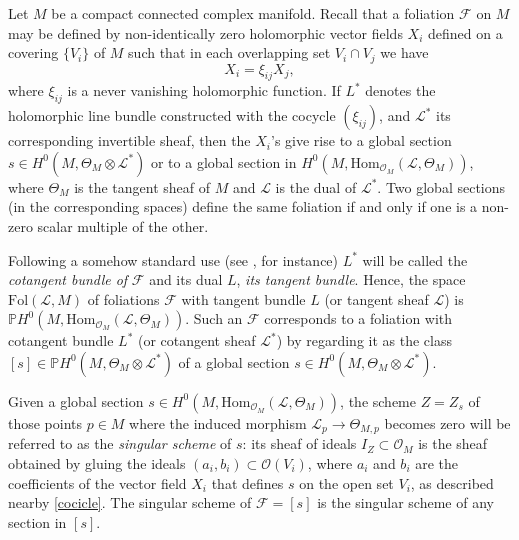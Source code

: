 \documentclass{amsart} %
\theoremstyle{definition}
\newcommand{\ctM}{\Theta_{M}}
\newcommand{\cts}{\Theta_{S_{\delta}}}
\newcommand{\PP}{\mathbb{P}}
\newcommand{\mcL}{\mathcal{L}}
\newcommand{\mcO}{\mathcal{O}}
\newcommand{\mcF}{\mathcal{F}}
\begin{document}
Let $ M $ be a compact connected complex manifold. Recall that a
foliation $\mathcal F$ on $ M $ %
may be defined by
non-identically zero holomorphic vector fields $ X_i $ defined on a covering $ \{ V_i \} $ of $ M $
such that in each overlapping set $ V_i \cap V_j $ we have
\begin{equation}\label{cocicle}
   X_i = \xi_{ij} X_j,
\end{equation}
where $ \xi_{ij} $ is a never vanishing holomorphic function. If
$ L^* $ denotes the holomorphic line bundle constructed with the cocycle $( \xi_{ij} )$,
and $\mcL^*$ its corresponding invertible sheaf,
then the $ X_i $'s give rise to a global section
$ s \in H^{0}(  M , \ctM \otimes \mcL^{*}) $ or to a global section in
$ H^{0}( M, \mathrm{Hom}_{ \mcO_M} (\mcL , \ctM) )$, where
$ \ctM $ is the tangent sheaf of $ M $ and $\mcL$ is the dual
of $\mcL^{*}$.
 Two global sections (in the corresponding spaces) define the same
foliation if and only if one is a non-zero scalar multiple of the other.

Following a somehow standard use (see  \cite{Brunella}, for instance) %
$ L^* $ will be called the \emph{cotangent bundle of} $\mathcal F$ and its dual %
$ L$, \emph{its tangent bundle}. Hence, the space $\mathrm{Fol}(\mcL, M) $ of foliations
$ \mcF $ with tangent bundle $ L $ (or tangent sheaf $ \mcL $)
 is $ \PP H^{0}( M, \mathrm{Hom}_{ \mcO_M} (\mcL , \ctM) )$.
Such an $ \mcF $ corresponds to a foliation with cotangent bundle $ L^*$ (or cotangent sheaf $ \mcL^* $)
by regarding it as the class $ [ s ] \in \PP H^{0}( M, \ctM \otimes \mcL^{*}) $ %
of a global section $ s \in H^{0}( M, \ctM \otimes \mcL^{*}) $.


Given a global section
$ s \in H^{0}( M, \mathrm{Hom}_{ \mcO_M} (\mcL , \ctM) )$,
the scheme $ Z = Z_s $ of those points %
$p\in M $ where the induced morphism
$\mcL_p\rightarrow \Theta_{M,p}$ becomes zero will be referred to as
the \emph{singular scheme} of $ s $: its sheaf of ideals $ I_Z \subset \mcO_M $
is the sheaf obtained by gluing the ideals $ (a_i, b_i) \subset \mcO( V_i ) $,
where $ a_i $ and $ b_i $ are the coefficients of the vector field $ X_i $ that defines
$ s $ on the open set $ V_i $, as described nearby \eqref{cocicle}. The singular scheme
of $ \mcF = [s] $ is the singular scheme of any section in $ [s] $.
\end{document}
